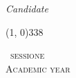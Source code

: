 \documentclass[../thesis.tex]{subfiles}
\begin{document}
\begin{titlepage}
\begin{center}
\begin{large}
                \vspace{0pt} 

                \begin{flushright}
                    \textit{Candidate}\\
                    \vspace{1pt}
                    \myName
                \end{flushright}
            \end{large}

            \vfill

            \line(1, 0){338} \\
            
            \begin{normalsize}
                \textsc{\mySession~sessione}\\
                \textsc{Academic year \myAY}
            \end{normalsize}

        \end{center}
    \end{titlepage}
\end{document}
